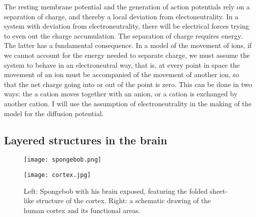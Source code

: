 \documentclass{article}
\begin{document}
The resting membrane potential and the generation of action potentials rely on a separation of charge, and thereby a local deviation from electoneutrality. In a system with deviation from electroneutrality, there will be electrical forces trying to even out the charge accumulation. The separation of charge requires energy. The latter has a fundamental consequence. In a model of the movement of ions, if we cannot account for the energy needed to separate charge, we must assume the system to behave in an electroneutral way, that is, at every point in space the movement of an ion must be accompanied of the movement of another ion, so that the net charge going into or out of the point is zero. This can be done in two ways: the a cation moves together with an anion, or a cation is exchanged by another cation. I will use the assumption of electroneutrality in the making of the model for the diffusion potential.

\subsection{Layered structures in the brain}\label{Layered structures}
\begin{figure}[!tbp]
  \centering
  \begin{minipage}[b]{0.45\textwidth}
    \texttt{[image: spongebob.png]}
  \end{minipage}
  \begin{minipage}[b]{0.45\textwidth}
    \texttt{[image: cortex.jpg]}
  \end{minipage}  
   \caption{Left: Spongebob with his brain exposed, featuring the folded sheet-like structure of the cortex. Right: a schematic drawing of the human cortex and its functional areas.}
  \label{fig:spongebob}
\end{figure}
\end{document}
